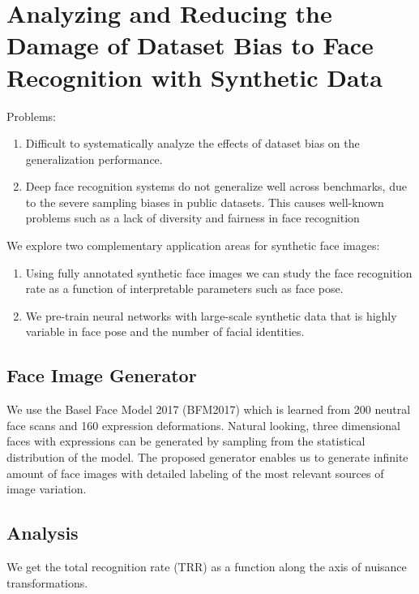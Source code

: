 \documentclass[12pt]{article}
\begin{document}
\section{Analyzing and Reducing the Damage of Dataset Bias
to Face Recognition with Synthetic Data}
Problems:
\begin{enumerate}
  \item Difficult to
  systematically analyze the effects of dataset bias on the generalization performance.
  \item Deep face recognition systems do not generalize well across benchmarks, due to the severe sampling
  biases in public datasets. This
  causes well-known problems such as a lack of diversity and
  fairness in face recognition 
\end{enumerate}
We explore two complementary application areas
for synthetic face images:
\begin{enumerate}
  \item Using fully annotated synthetic face images we can study the face recognition rate as a function of interpretable parameters such as face pose.
  \item We pre-train neural networks with large-scale synthetic data that is highly variable in face pose and the number of facial identities.
\end{enumerate}
\subsection{Face Image Generator}
We use the Basel Face Model 2017 (BFM2017) which is learned from 200 neutral face scans and
160 expression deformations. Natural looking, three dimensional faces with expressions can be generated by sampling
from the statistical distribution of the model. The proposed generator
enables us to generate infinite amount of face images with
detailed labeling of the most relevant sources of image variation.
\subsection{Analysis}
We get the total
recognition rate (TRR) as a function along the axis of nuisance transformations.
\end{document}
